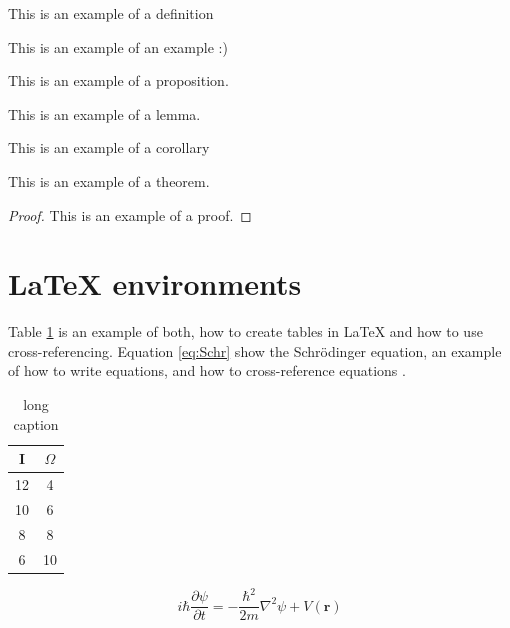 \begin{definition}
This is an example of a definition
\end{definition}

\begin{example}
This is an example of an example :)
\end{example}

\begin{proposition}
This is an example of a proposition.
\end{proposition}

\begin{lemma}
This is an example of a lemma.
\end{lemma}

\begin{corollary}
This is an example of a corollary
\end{corollary}

\begin{theorem}
This is an example of a theorem.
\end{theorem}

\begin{proof}
This is an example of a proof.
\end{proof}

\section{\LaTeX{} environments}

Table \ref{tab:ResistanceTable} is an example of both, how to create tables in \LaTeX{} and how to use cross-referencing. Equation \ref{eq:Schr} show the Schr\"{o}dinger equation, an example of how to write equations, and how to cross-reference equations \cite{Quantum}.

\begin{table}[h!]
	\centering
	\begin{tabular}{c | c}
		I & $\Omega$ \\ \hline
		12 & 4 \\
		10 & 6 \\
		8 & 8 \\
		6 & 10 \\
	\end{tabular}
	\caption[short caption]{long caption}%
	\label{tab:ResistanceTable}
\end{table}

\begin{equation}
i\hbar \frac{\partial \psi}{\partial t} = -\frac{\hbar^2}{2m}\nabla^2 \psi + V(\mathbf{r})
\label{eq:Schr}
\end{equation}

